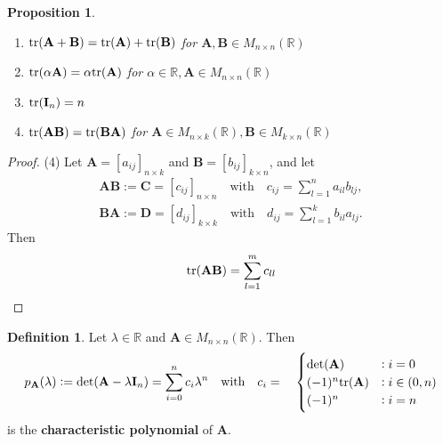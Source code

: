 \documentclass[12pt,openany]{book}
\newtheorem{proposition}[theorem]{Proposition}
\theoremstyle{definition}
\newtheorem{definition}{Definition}[chapter]
\newcommand{\R}{\mathbb{R}}
\newcommand{\by}{\times}
\newcommand{\tr}{\textnormal{tr}}
\begin{document}
	\vspace{4pt}
	\begin{tcolorbox}[colframe=procolor,title={\color{white}\bf }]
		\begin{proposition}
			\ \begin{enumerate}[(1)]
				\item \(\tr(\textbf{A}+\textbf{B})=\tr(\textbf{A})+\tr(\textbf{B})\) for \(\textbf{A},\textbf{B}\in M_{n\by n}(\R)\)
				\item \(\tr(\alpha\textbf{A})=\alpha\tr(\textbf{A})\) for \(\alpha\in\R,\textbf{A}\in M_{n\by n}(\R)\)
				\item \(\tr(\textbf{I}_n)=n\)
				\item \(\tr(\textbf{A}\textbf{B})=\tr(\textbf{B}\textbf{A})\) for \(\textbf{A}\in M_{n\by k}(\R),\textbf{B}\in M_{k\by n}(\R)\)
			\end{enumerate}
		\end{proposition}
	\end{tcolorbox}
	\begin{proof}
		(4) Let \(\textbf{A}=[a_{ij}]_{n\by k}\) and \(\textbf{B}=[b_{ij}]_{k\by n}\), and let
		\begin{align*}
			\textbf{AB}:=\textbf{C}=[c_{ij}]_{n\by n}\quad\text{with}\quad c_{ij}=\sum_{l=1}^na_{il}b_{lj},\\
			\textbf{BA}:=\textbf{D}=[d_{ij}]_{k\by k}\quad\text{with}\quad d_{ij}=\sum_{l=1}^kb_{il}a_{lj}.
		\end{align*}
		Then \begin{align*}
			\tr(\textbf{A}\textbf{B})=\sum_{l=1}^{m}c_{ll}
		\end{align*}
	\end{proof}
	
	\begin{tcolorbox}[colframe=defcolor,title={\color{white}\bf Charateristic Polynomial}]
		\begin{definition}
			Let \(\lambda\in\R\) and \(\textbf{A}\in M_{n\by n}(\R)\). Then \[
			p_\textbf{A}(\lambda):=\det(\textbf{A}-\lambda\textbf{I}_n)=\sum_{i=0}^nc_i\lambda^n\quad\text{with}\quad c_i=\quad\begin{cases}
				\det(\textbf{A}) &:i=0\\
				(-1)^n\tr(\textbf{A})&:i\in(0,n)\\
				(-1)^n &:i=n
			\end{cases}
			\] is the \textbf{characteristic polynomial} of \(\textbf{A}\).
		\end{definition}
	\end{tcolorbox}
	
\end{document}
